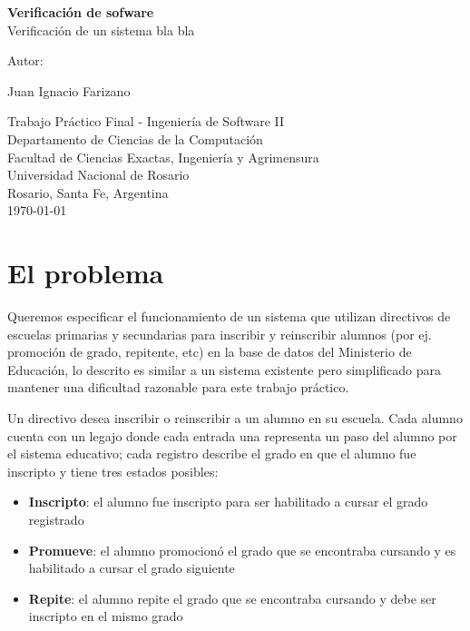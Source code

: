 \documentclass{article}
\begin{document}
\begin{titlepage}
  \thispagestyle{empty}
  \begin{center}
    
    {\huge \textbf{Verificación de sofware} \\[0.4cm]}
    {\large Verificación de un sistema bla bla} \\
    \noindent
    
    \vfill
    \vfill
    \vfill
    {\Large Autor: \par}
    {\Large Juan Ignacio Farizano\par}
  
    \vfill
    Trabajo Práctico Final - Ingeniería de Software II \\
    Departamento de Ciencias de la Computaci\'on\\
    Facultad de Ciencias Exactas, Ingenier\'ia y Agrimensura\\
    Universidad Nacional de Rosario \\
    Rosario, Santa Fe, Argentina\\[0.4cm]
    {\large \today} 
  \end{center}
  \end{titlepage}

\section*{El problema}
Queremos especificar el funcionamiento de un sistema que utilizan directivos de escuelas primarias y secundarias para inscribir y reinscribir alumnos (por ej. promoción de grado, repitente, etc) en la base de datos del Ministerio de Educación, lo descrito es similar a un sistema existente pero simplificado para mantener una dificultad razonable para este trabajo práctico.


Un directivo desea inscribir o reinscribir a un alumno en su escuela. Cada alumno cuenta con un legajo donde cada entrada una representa un paso del alumno por el sistema educativo; cada registro describe el grado en que el alumno fue inscripto y tiene tres estados posibles:

\begin{itemize}
  \item \textbf{Inscripto}: el alumno fue inscripto para ser habilitado a cursar el grado registrado
  \item \textbf{Promueve}: el alumno promocionó el grado que se encontraba cursando y es habilitado a cursar el grado siguiente
  \item \textbf{Repite}: el alumno repite el grado que se encontraba cursando y debe ser inscripto en el mismo grado
\end{itemize}
\end{document}
